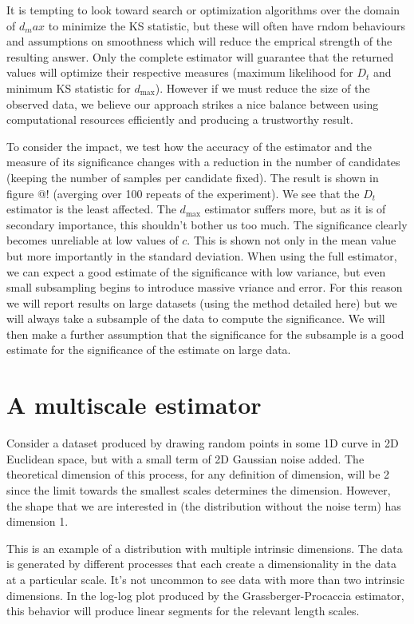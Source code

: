 \documentclass[11pt]{article}
\begin{document}
It is tempting to look toward search or optimization algorithms over the domain of $d_max$ to minimize the KS statistic, but these will often have rndom behaviours and assumptions on smoothness which will reduce the emprical strength of the resulting answer. Only the complete estimator will guarantee that the returned values will optimize their respective measures (maximum likelihood for $D_t$ and minimum KS statistic for $d_{\max}$). However if we must reduce the size of the observed data, we believe our approach strikes a nice balance between using computational resources efficiently and producing a trustworthy result.

To consider the impact, we test how the accuracy of the estimator and the measure of its significance changes with a reduction in the number of candidates (keeping the number of samples per candidate fixed). The result is shown in figure @! (averging over 100 repeats of the experiment). We see that the $D_t$ estimator is the least affected. The $d_{\max}$ estimator suffers more, but as it is of secondary importance, this shouldn't bother us too much. The significance clearly becomes unreliable at low values of $c$. This is shown not only in the mean value but more importantly in the standard deviation. When using the full estimator, we can expect a good estimate of the significance with low variance, but even small subsampling begins to introduce massive vriance and error. For this reason we will report results on large datasets (using the method detailed here) but we will always take a subsample of the data to compute the significance. We will then make a further assumption that the significance for the subsample is a good estimate for the significance of the estimate on large data.

\section{A multiscale estimator}

Consider a dataset produced by drawing random points in some 1D curve in 2D Euclidean space, but with a small term of 2D Gaussian noise added. The theoretical dimension of this process, for any definition of dimension, will be 2 since the limit towards the smallest scales determines the dimension. However, the shape that we are interested in (the distribution without the noise term) has dimension 1. 

This is an example of a distribution with multiple intrinsic dimensions. The data is generated by different processes that each create a dimensionality in the data at a particular scale. It's not uncommon to see data with more than two intrinsic dimensions. In the log-log plot produced by the Grassberger-Procaccia estimator, this behavior will produce linear segments for the relevant length scales.
\end{document}
